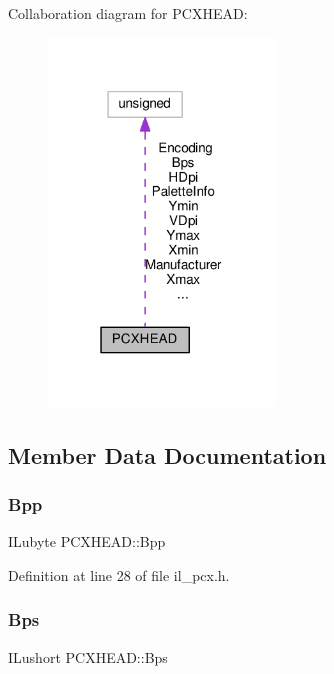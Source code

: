 Collaboration diagram for P\+C\+X\+H\+E\+AD\+:
\nopagebreak
\begin{figure}[H]
\begin{center}
\leavevmode
\includegraphics[width=171pt]{df/d12/structPCXHEAD__coll__graph}
\end{center}
\end{figure}


\subsection{Member Data Documentation}
\mbox{\label{structPCXHEAD_af010d2cb3f91e5c63ee725ac338cc9e4}} 
\subsubsection{\texorpdfstring{Bpp}{Bpp}}
{\footnotesize\ttfamily I\+Lubyte P\+C\+X\+H\+E\+A\+D\+::\+Bpp}



Definition at line 28 of file il\+\_\+pcx.\+h.

\mbox{\label{structPCXHEAD_a12cdbf472dd1b5120f9eb84542c9d763}} 
\subsubsection{\texorpdfstring{Bps}{Bps}}
{\footnotesize\ttfamily I\+Lushort P\+C\+X\+H\+E\+A\+D\+::\+Bps}



